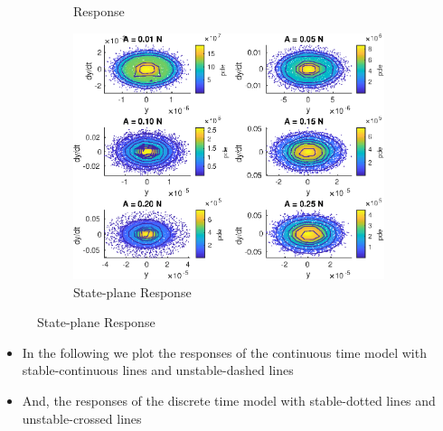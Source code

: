 \documentclass[aspectratio=169]{beamer}
\begin{document}
\begin{frame}[allowframebreaks]
\begin{figure}
\begin{subfigure}{0.33\linewidth}
      \caption{Response}
    \end{subfigure}%
    \begin{subfigure}{0.33\linewidth}
      \includegraphics[width=\linewidth]{../../../benchmark1/fig/MS_stateplanekde}
      \caption{State-plane Response}
    \end{subfigure}%
  \end{figure}
  \begin{itemize}
  \item In the following we plot the responses of the continuous time
    model with stable-continuous lines and unstable-dashed lines
  \item And, the responses of the discrete time model with
    stable-dotted lines and unstable-crossed lines
  \end{itemize}
\end{frame}
\end{document}
